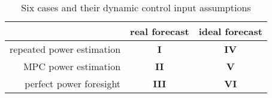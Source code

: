 \begin{table}[htb]\centering
	\begin{tabular}{r | c c}
		& real forecast & ideal forecast\\
		\hline
		repeated power estimation & \textbf{I} & \textbf{IV}\\
		MPC power estimation & \textbf{II} & \textbf{V}\\
		perfect power foresight & \textbf{III} & \textbf{VI}\\
	\end{tabular}
	\caption{Six cases and their dynamic control input assumptions}
	\label{ch2:tab:cases}	
\end{table}